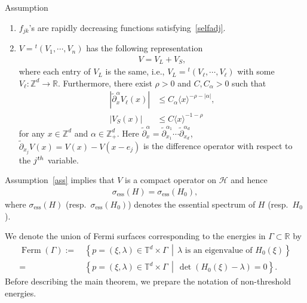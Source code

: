 \documentclass[10pt,a4paper]{amsart}
\renewcommand{\a}{\alpha}
\renewcommand{\l}{\lambda}
\newcommand{\x}{\xi}
\newcommand{\R}{\mathbb{R}}
\newcommand{\Z}{\mathbb{Z}}
\newcommand{\T}{\mathbb{T}}
\newcommand{\HS}{\mathcal{H}}
\newcommand{\la}{\langle}
\newcommand{\ra}{\rangle}
\DeclareMathOperator{\Ferm}{Ferm}
\begin{document}
\begin{enonce}{Assumption}\label{ass}\leavevmode
\begin{enumerate}
\item\label{assum1.1.1} $f_{jk}$'s are rapidly decreasing functions satisfying~\eqref{selfadj}.

\item\label{assum1.1.2} $V={}^t(V_1, \cdots, V_n)$ has the following representation
\begin{align*}
V=V_L + V_S,
\end{align*}
where each entry of $V_L$ is the same, i.e., $V_L={}^t(V_\ell, \cdots, V_\ell)$ with some $V_\ell : \Z^d \to \R$. Furthermore, there exist $\rho>0$ and $C,C_\a>0$ such that
\begin{align}
\left|\tilde\partial_x^\a V_\ell(x)\right| &\leq C_\a \la x \ra^{-\rho-|\a|}, \label{long range}
\\
|V_S(x)| &\leq C \la x \ra^{-1-\rho} \label{short range}
\end{align}
for any $x\in\Z^d$ and $\a\in\Z_+^d$. Here $\tilde\partial_x^\a=\tilde\partial_{x_1}^{\a_1} \cdots \tilde\partial_{x_d}^{\a_d}$, $\tilde \partial_{x_j} V(x)=V(x)-V(x-e_j)$ is the difference operator with respect to the $j^{\rm th}$ variable.
\end{enumerate}
\end{enonce}


Assumption~\ref{ass} implies that $V$ is a compact operator on $\HS$ and hence
\begin{align*}
\sigma_{\operatorname{ess}}(H)=\sigma_{\operatorname{ess}}(H_0),
\end{align*}
where $\sigma_{\operatorname{ess}}(H)$ (resp.\ $\sigma_{\operatorname{ess}}(H_0)$) denotes the essential spectrum of $H$ (resp.\ $H_0$).


We denote the union of Fermi surfaces corresponding to the energies in $\Gamma\subset\R$ by
\begin{align*}
\Ferm(\Gamma):=&\,\left\{ p = (\x,\l)\in\T^d\times\Gamma \,\middle|\, \l \text{ is an eigenvalue of }H_0(\x) \right\} \\
=&\, \left\{ p = (\x,\l)\in\T^d\times\Gamma \,\middle|\, \det \left(H_0(\x)-\l\right)=0 \right\}. 
\end{align*}
Before describing the main theorem, we prepare the notation of non-threshold energies.
\end{document}
